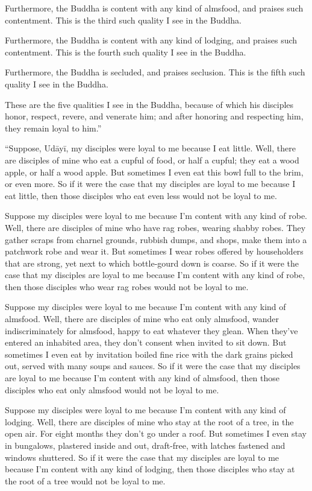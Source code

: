 \documentclass[12pt,openany]{book}%
\begin{document}
Furthermore, the Buddha is content with any kind of almsfood, and praises such contentment. This is the third such quality I see in the Buddha. 

Furthermore, the Buddha is content with any kind of lodging, and praises such contentment. This is the fourth such quality I see in the Buddha. 

Furthermore, the Buddha is secluded, and praises seclusion. This is the fifth such quality I see in the Buddha. 

These are the five qualities I see in the Buddha, because of which his disciples honor, respect, revere, and venerate him; and after honoring and respecting him, they remain loyal to him.” 

“Suppose, \textsanskrit{Udāyī}, my disciples were loyal to me because I eat little. Well, there are disciples of mine who eat a cupful of food, or half a cupful; they eat a wood apple, or half a wood apple. But sometimes I even eat this bowl full to the brim, or even more. So if it were the case that my disciples are loyal to me because I eat little, then those disciples who eat even less would not be loyal to me. 

Suppose my disciples were loyal to me because I’m content with any kind of robe. Well, there are disciples of mine who have rag robes, wearing shabby robes. They gather scraps from charnel grounds, rubbish dumps, and shops, make them into a patchwork robe and wear it. But sometimes I wear robes offered by householders that are strong, yet next to which bottle-gourd down is coarse. So if it were the case that my disciples are loyal to me because I’m content with any kind of robe, then those disciples who wear rag robes would not be loyal to me. 

Suppose my disciples were loyal to me because I’m content with any kind of almsfood. Well, there are disciples of mine who eat only almsfood, wander indiscriminately for almsfood, happy to eat whatever they glean. When they’ve entered an inhabited area, they don’t consent when invited to sit down. But sometimes I even eat by invitation boiled fine rice with the dark grains picked out, served with many soups and sauces. So if it were the case that my disciples are loyal to me because I’m content with any kind of almsfood, then those disciples who eat only almsfood would not be loyal to me. 

Suppose my disciples were loyal to me because I’m content with any kind of lodging. Well, there are disciples of mine who stay at the root of a tree, in the open air. For eight months they don’t go under a roof. But sometimes I even stay in bungalows, plastered inside and out, draft-free, with latches fastened and windows shuttered. So if it were the case that my disciples are loyal to me because I’m content with any kind of lodging, then those disciples who stay at the root of a tree would not be loyal to me. 
\end{document}
